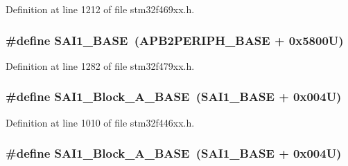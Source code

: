 Definition at line 1212 of file stm32f469xx.\+h.

\subsubsection[{\texorpdfstring{S\+A\+I1\+\_\+\+B\+A\+SE}{SAI1_BASE}}]{\setlength{\rightskip}{0pt plus 5cm}\#define S\+A\+I1\+\_\+\+B\+A\+SE~({\bf A\+P\+B2\+P\+E\+R\+I\+P\+H\+\_\+\+B\+A\+SE} + 0x5800\+U)}\hypertarget{group___peripheral__memory__map_ga24c1053b754946b512f9c31123e09d21}{}\label{group___peripheral__memory__map_ga24c1053b754946b512f9c31123e09d21}


Definition at line 1282 of file stm32f479xx.\+h.

\subsubsection[{\texorpdfstring{S\+A\+I1\+\_\+\+Block\+\_\+\+A\+\_\+\+B\+A\+SE}{SAI1_Block_A_BASE}}]{\setlength{\rightskip}{0pt plus 5cm}\#define S\+A\+I1\+\_\+\+Block\+\_\+\+A\+\_\+\+B\+A\+SE~({\bf S\+A\+I1\+\_\+\+B\+A\+SE} + 0x004\+U)}\hypertarget{group___peripheral__memory__map_ga31f72e5e5d7aea23bc8a5191bc32e900}{}\label{group___peripheral__memory__map_ga31f72e5e5d7aea23bc8a5191bc32e900}


Definition at line 1010 of file stm32f446xx.\+h.

\subsubsection[{\texorpdfstring{S\+A\+I1\+\_\+\+Block\+\_\+\+A\+\_\+\+B\+A\+SE}{SAI1_Block_A_BASE}}]{\setlength{\rightskip}{0pt plus 5cm}\#define S\+A\+I1\+\_\+\+Block\+\_\+\+A\+\_\+\+B\+A\+SE~({\bf S\+A\+I1\+\_\+\+B\+A\+SE} + 0x004\+U)}\hypertarget{group___peripheral__memory__map_ga31f72e5e5d7aea23bc8a5191bc32e900}{}\label{group___peripheral__memory__map_ga31f72e5e5d7aea23bc8a5191bc32e900}


